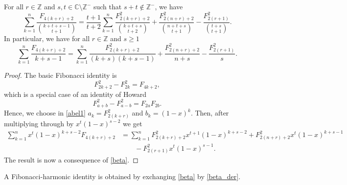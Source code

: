 \documentclass[12pt,reqno]{article}
\begin{document}
	\begin{theorem}\label{thm1_Fib_squared}
		For all $r\in\mathbb Z$ and $s,t\in\mathbb C\setminus\mathbb Z^{-}$ such that $s+t\not\in\mathbb Z^{-}$, we have
		\begin{equation}
			\sum_{k = 1}^n \frac{F_{4(k+r)+2}}{\binom{k + t + s - 1}{t + 1}} =
			\frac{t + 1}{t + 2} \sum_{k = 1}^n \frac{F_{2(k+r)+2}^2}{\binom{k + t + s}{t + 2}} + \frac{F_{2(n+r)+2}^2}{\binom{n + t + s}{t + 1}}
			- \frac{F_{2(r+1)}^2}{\binom{t + s}{t + 1}}.
		\end{equation}
		In particular, we have for all $r\in\mathbb Z$ and $s\geq 1$
		\begin{equation}
			\sum_{k = 1}^n \frac{F_{4(k+r)+2}}{k + s - 1} = \sum_{k = 1}^n \frac{F_{2(k+r)+2}^2}{(k+s)(k+s-1)} + \frac{F_{2(n+r)+2}^2}{n+s}
			- \frac{F_{2(r+1)}^2}{s}.
		\end{equation}
	\end{theorem}
	\begin{proof}
		The basic Fibonacci identity is
		\begin{equation*}
			F_{2k+2}^2 - F_{2k}^2 = F_{4k+2},
		\end{equation*}
		which is a special case of an identity of Howard \cite{Howard03}
		\begin{equation}\label{Howard_id}
			F_{a+b}^2 - F_{a-b}^2 = F_{2a} F_{2b}.
		\end{equation}
		Hence, we choose in \eqref{abel1} $a_k=F_{2(k+r)}^2$ and $b_k=(1-x)^k$. Then, after multiplying through by $x^t (1-x)^{s-2}$ we get
		\begin{equation*}
			\begin{split}
				\sum_{k = 1}^n x^t (1-x)^{k + s - 2} F_{4(k + r) + 2} &= \sum_{k = 1}^n F_{2(k + r) + 2}^2 x^{t+1} (1-x)^{k+s-2}
				+ F_{2(n + r) + 2}^2 x^{t} (1-x)^{k+s-1} \\
				&\qquad - F_{2(r + 1)}^2 x^t (1-x)^{s-1}.
			\end{split}
		\end{equation*}
		The result is now a consequence of \eqref{beta}.
	\end{proof}
	A Fibonacci-harmonic identity is obtained by exchanging \eqref{beta} by \eqref{beta_der}.
	
\end{document}
